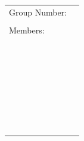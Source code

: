 \documentclass[
  course = {{MATH102 Calculus II}},
  quartile = {{2}},
  assignment = 2,
  firstexercise = 1,
  term = 202
]{aga-homework}
\begin{document}

\begin{center}
  {\large
  \begin{tabular}{|l|l|}
    \hline
    Group Number: & \hspace{3in} \\
     &  \\ \hline
    Members: &  \\
        &  \\ \cline{2-2}
        &  \\
        &  \\ \cline{2-2}
        &  \\
        &  \\ \cline{2-2}
        &  \\
        &  \\ \cline{2-2}
        &  \\
        &  \\ \cline{2-2}
        &  \\
        &  \\ \cline{2-2}
        &  \\
        &  \\ \cline{2-2}
        &  \\
        &  \\ \cline{2-2}
        &  \\
        &  \\ \cline{2-2}
        &  \\
        &  \\ \cline{2-2}
        &  \\
        &  \\ \cline{2-2}
        &  \\
        &  \\ \cline{2-2}
        &  \\
        &  \\ \cline{2-2}
        &  \\
        &  \\ \cline{2-2}
        &  \\
        &  \\ \cline{2-2}
        &  \\
        &  \\
    \hline
  \end{tabular}
  }
\end{center}
\end{document}
